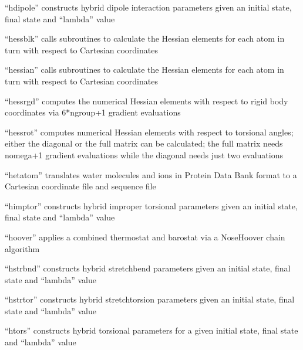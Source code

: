 \documentclass[letterpaper,11pt,english]{sphinxmanual}
\begin{document}

“hdipole” constructs hybrid dipole interaction parameters
given an initial state, final state and “lambda” value


“hessblk” calls subroutines to calculate the Hessian elements
for each atom in turn with respect to Cartesian coordinates


“hessian” calls subroutines to calculate the Hessian elements
for each atom in turn with respect to Cartesian coordinates


“hessrgd” computes the numerical Hessian elements with
respect to rigid body coordinates via 6*ngroup+1 gradient
evaluations


“hessrot” computes numerical Hessian elements with respect
to torsional angles; either the diagonal or the full matrix
can be calculated; the full matrix needs nomega+1 gradient
evaluations while the diagonal needs just two evaluations


“hetatom” translates water molecules and ions in Protein Data
Bank format to a Cartesian coordinate file and sequence file


“himptor” constructs hybrid improper torsional parameters
given an initial state, final state and “lambda” value


“hoover” applies a combined thermostat and barostat via a
Nose\sphinxhyphen{}Hoover chain algorithm


“hstrbnd” constructs hybrid stretch\sphinxhyphen{}bend parameters given
an initial state, final state and “lambda” value


“hstrtor” constructs hybrid stretch\sphinxhyphen{}torsion parameters
given an initial state, final state and “lambda” value


“htors” constructs hybrid torsional parameters for a given
initial state, final state and “lambda” value
\end{document}
